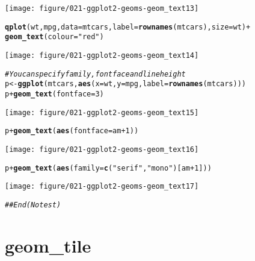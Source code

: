 \documentclass[a4paper,titlepage]{tufte-handout}\usepackage[]{graphicx}\usepackage[]{color}
\makeatletter
\def\maxwidth{ %
  \ifdim\Gin@nat@width>\linewidth
    \linewidth
  \else
    \Gin@nat@width
  \fi
}
\newcommand{\hlnum}[1]{\textcolor[rgb]{0.686,0.059,0.569}{#1}}%
\newcommand{\hlstr}[1]{\textcolor[rgb]{0.192,0.494,0.8}{#1}}%
\newcommand{\hlcom}[1]{\textcolor[rgb]{0.678,0.584,0.686}{\textit{#1}}}%
\newcommand{\hlopt}[1]{\textcolor[rgb]{0,0,0}{#1}}%
\newcommand{\hlstd}[1]{\textcolor[rgb]{0.345,0.345,0.345}{#1}}%
\newcommand{\hlkwb}[1]{\textcolor[rgb]{0.69,0.353,0.396}{#1}}%
\newcommand{\hlkwc}[1]{\textcolor[rgb]{0.333,0.667,0.333}{#1}}%
\newcommand{\hlkwd}[1]{\textcolor[rgb]{0.737,0.353,0.396}{\textbf{#1}}}%
\newenvironment{kframe}{%
 \def\at@end@of@kframe{}%
 \ifinner\ifhmode%
  \def\at@end@of@kframe{\end{minipage}}%
  \begin{minipage}{\columnwidth}%
 \fi\fi%
 \def\FrameCommand##1{\hskip\@totalleftmargin \hskip-\fboxsep
 \colorbox{shadecolor}{##1}\hskip-\fboxsep
     \hskip-\linewidth \hskip-\@totalleftmargin \hskip\columnwidth}%
 \MakeFramed {\advance\hsize-\width
   \@totalleftmargin\z@ \linewidth\hsize
   \@setminipage}}%
 {\par\unskip\endMakeFramed%
 \at@end@of@kframe}
\newenvironment{knitrout}{}{} %
\makeatother
\begin{document}
\begin{knitrout}
\begin{kframe}
\end{kframe}
\texttt{[image: figure/021-ggplot2-geoms-geom\_text13]} 
\begin{kframe}\begin{alltt}
\hlkwd{qplot}\hlstd{(wt, mpg,} \hlkwc{data} \hlstd{= mtcars,} \hlkwc{label} \hlstd{=} \hlkwd{rownames}\hlstd{(mtcars),} \hlkwc{size} \hlstd{= wt)} \hlopt{+}
  \hlkwd{geom_text}\hlstd{(}\hlkwc{colour} \hlstd{=} \hlstr{"red"}\hlstd{)}
\end{alltt}
\end{kframe}
\texttt{[image: figure/021-ggplot2-geoms-geom\_text14]} 
\begin{kframe}\begin{alltt}
\hlcom{# You can specify family, fontface and lineheight}
\hlstd{p} \hlkwb{<-} \hlkwd{ggplot}\hlstd{(mtcars,} \hlkwd{aes}\hlstd{(}\hlkwc{x}\hlstd{=wt,} \hlkwc{y}\hlstd{=mpg,} \hlkwc{label}\hlstd{=}\hlkwd{rownames}\hlstd{(mtcars)))}
\hlstd{p} \hlopt{+} \hlkwd{geom_text}\hlstd{(}\hlkwc{fontface}\hlstd{=}\hlnum{3}\hlstd{)}
\end{alltt}
\end{kframe}
\texttt{[image: figure/021-ggplot2-geoms-geom\_text15]} 
\begin{kframe}\begin{alltt}
\hlstd{p} \hlopt{+} \hlkwd{geom_text}\hlstd{(}\hlkwd{aes}\hlstd{(}\hlkwc{fontface}\hlstd{=am}\hlopt{+}\hlnum{1}\hlstd{))}
\end{alltt}
\end{kframe}
\texttt{[image: figure/021-ggplot2-geoms-geom\_text16]} 
\begin{kframe}\begin{alltt}
\hlstd{p} \hlopt{+} \hlkwd{geom_text}\hlstd{(}\hlkwd{aes}\hlstd{(}\hlkwc{family}\hlstd{=}\hlkwd{c}\hlstd{(}\hlstr{"serif"}\hlstd{,} \hlstr{"mono"}\hlstd{)[am}\hlopt{+}\hlnum{1}\hlstd{]))}
\end{alltt}
\end{kframe}
\texttt{[image: figure/021-ggplot2-geoms-geom\_text17]} 
\begin{kframe}\begin{alltt}
\hlcom{## End(No test)}
\end{alltt}
\end{kframe}
\end{knitrout}


\section{geom\_tile}
\end{document}
